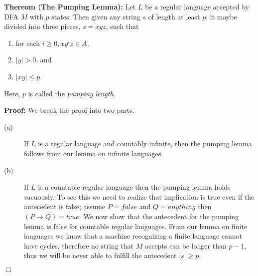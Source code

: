 \documentclass[a4paper,blends,pdf,colorBG,slideColor]{prosper}
\begin{document}
{\small
{\bf Thereom (The Pumping Lemma):}  Let $L$ be a regular language accepted 
by DFA $M$ with $p$ states.  Then given any string $s$ of length at least $p$, it maybe
divided into
three pieces, $s = xyz$, such that
\begin{enumerate}
\item for each $i \ge 0, xy^iz \in A$,
\item $\mid y\mid > 0$, and
\item $\mid xy \mid \le p$.
\end{enumerate}
Here, $p$ is called the {\em pumping length}.

{\bf Proof:} We break the proof into two parts. 
\begin{description}
\item[(a)] If $L$ is a regular language and countably infinite, then the pumping lemma follows from
our lemma on infinite languages.

\item[(b)] If $L$ is a countable regular language then the pumping lemma holds vacuously.  To see this we need to
realize that implication is true even if the antecedent is false; assume $P = false$ and $Q= anything$ then
$(P \rightarrow Q) = true$.  We now show that the antecedent for the pumping lemma is false
for countable regular languages. From our lemma on finite languages we know that a machine
recognizing a finite language cannot have cycles, therefore no string that $M$ accepts
can be longer than $p-1$, thus we will be never able to fulfill the antecedent $|s| \ge p$.
\end{description}
$\Box$
}
\es
\end{document}

